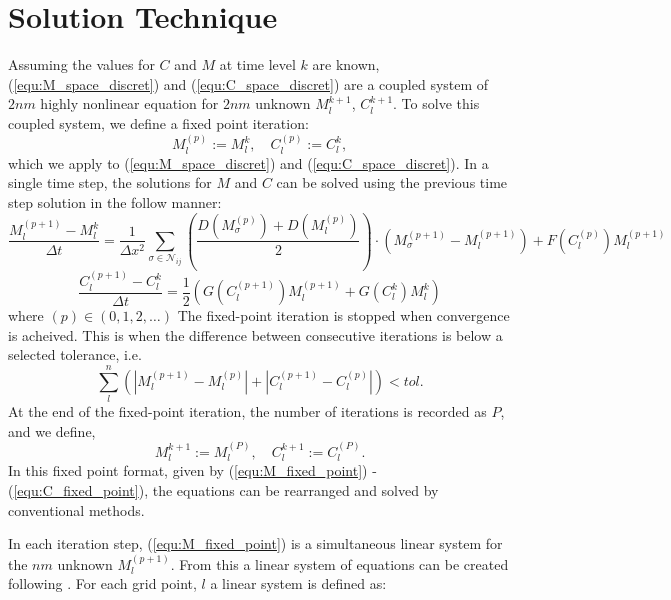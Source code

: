 \section{Solution Technique}

Assuming the values for $C$ and $M$ at time level $k$ are known, (\ref{equ:M_space_discret}) and (\ref{equ:C_space_discret}) are a coupled system of $2nm$ highly nonlinear equation for $2nm$ unknown $M^{k+1}_{l}$, $C^{k+1}_{l}$.
To solve this coupled system, we define a fixed point iteration: 
\begin{equation}
  M^{(p)}_{l} := M^{k}_{l}, \quad C^{(p)}_{l} := C^{k}_{l},
\end{equation}
which we apply to (\ref{equ:M_space_discret}) and (\ref{equ:C_space_discret}).
In a single time step, the solutions for $M$ and $C$ can be solved using the previous time step solution in the follow manner:
\begin{equation} \label{equ:M_fixed_point}
  \frac{M^{(p+1)}_{l} - M^{k}_{l}}{\Delta t} = 
    \frac{1}{\Delta x^2} \sum_{\sigma \in \mathcal{N}_{ij}}
    \left( \frac{D(M^{(p)}_{\sigma}) + D(M^{(p)}_{l})}{2} \right)
    \cdot \left( M^{(p+1)}_{\sigma} - M^{(p+1)}_{l} \right)
    + F(C^{(p)}_{l}) M^{(p+1)}_{l}
\end{equation}
\begin{equation} \label{equ:C_fixed_point}
  \frac{C^{(p+1)}_{l} - C^{k}_{l}}{\Delta t} = \frac{1}{2} ( G(C^{(p+1)}_{l} ) M^{(p+1)}_{l} + G(C^{k}_{l}) M^{k}_{l} )
\end{equation}
where $(p) \in (0,1,2,\ldots)$
The fixed-point iteration is stopped when convergence is acheived.
This is when the difference between consecutive iterations is below a selected tolerance, i.e.
\begin{equation}
  \sum^{n}_{l} \left( \left| M^{(p+1)}_{l} - M^{(p)}_{l}\right| + \left| C^{(p+1)}_{l} - C^{(p)}_{l} \right| \right) < tol.
\end{equation}
At the end of the fixed-point iteration, the number of iterations is recorded as $P$, and we define,
\begin{equation}
  M^{k+1}_{l} := M^{(P)}_{l}, \quad C^{k+1}_{l} := C^{(P)}_{l}.
\end{equation}
In this fixed point format, given by (\ref{equ:M_fixed_point}) - (\ref{equ:C_fixed_point}), the equations can be rearranged and solved by conventional methods.

In each iteration step, (\ref{equ:M_fixed_point}) is a simultaneous linear system for the $nm$ unknown $M^{(p+1)}_{l}$.
From this a linear system of equations can be created following \cite{saad2003iterativeMethod}.
For each grid point, $l$ a linear system is defined as:

